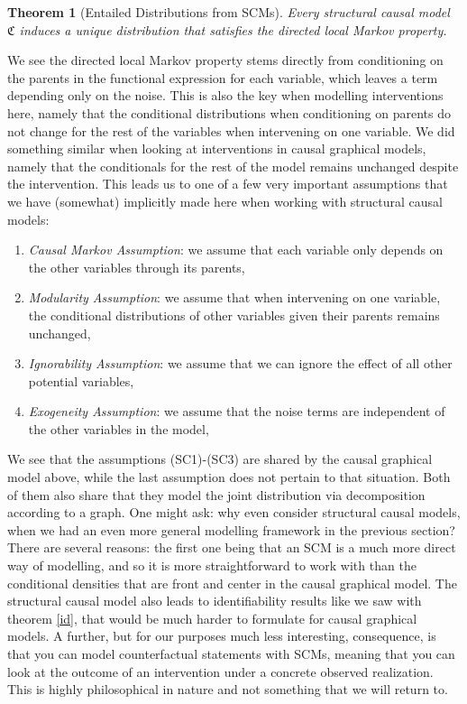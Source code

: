 \documentclass[11pt, a4paper]{memoir}
\theoremstyle{break}
\newtheorem{thm}{Theorem}
\theoremstyle{break}
\theoremstyle{nonumberplain}
\begin{document}
\begin{thm}[Entailed Distributions from SCMs]
Every structural causal model $\mathfrak{C}$ induces a unique distribution that satisfies the directed local Markov property.
\end{thm}
We see the directed local Markov property stems directly from conditioning on the parents in the functional expression for each variable, which leaves a term depending only on the noise. This is also the key when modelling interventions here, namely that the conditional distributions when conditioning on parents do not change for the rest of the variables when intervening on one variable. We did something similar when looking at interventions in causal graphical models, namely that the conditionals for the rest of the model remains unchanged despite the intervention. This leads us to one of a few very important assumptions that we have (somewhat) implicitly made here when working with structural causal models:
\begin{enumerate}[itemindent=15pt,label=(SC\arabic*)]
	\item \emph{Causal Markov Assumption}: we assume that each variable only depends on the other variables through its parents,
	\item \emph{Modularity Assumption}: we assume that when intervening on one variable, the conditional distributions of other variables given their parents remains unchanged,
	\item \emph{Ignorability Assumption}: we assume that we can ignore the effect of all other potential variables,
	\item \emph{Exogeneity Assumption}: we assume that the noise terms are independent of the other variables in the model,
\end{enumerate}
We see that the assumptions (SC1)-(SC3) are shared by the causal graphical model above, while the last assumption does not pertain to that situation. Both of them also share that they model the joint distribution via decomposition according to a graph. One might ask: why even consider structural causal models, when we had an even more general modelling framework in the previous section? There are several reasons: the first one being that an SCM is a much more direct way of modelling, and so it is more straightforward to work with than the conditional densities that are front and center in the causal graphical model. The structural causal model also leads to identifiability results like we saw with theorem \ref{id}, that would be much harder to formulate for causal graphical models. A further, but for our purposes much less interesting, consequence, is that you can model counterfactual statements with SCMs, meaning that you can look at the outcome of an intervention under a concrete observed realization. This is highly philosophical in nature and not something that we will return to.\\\\
\end{document}
